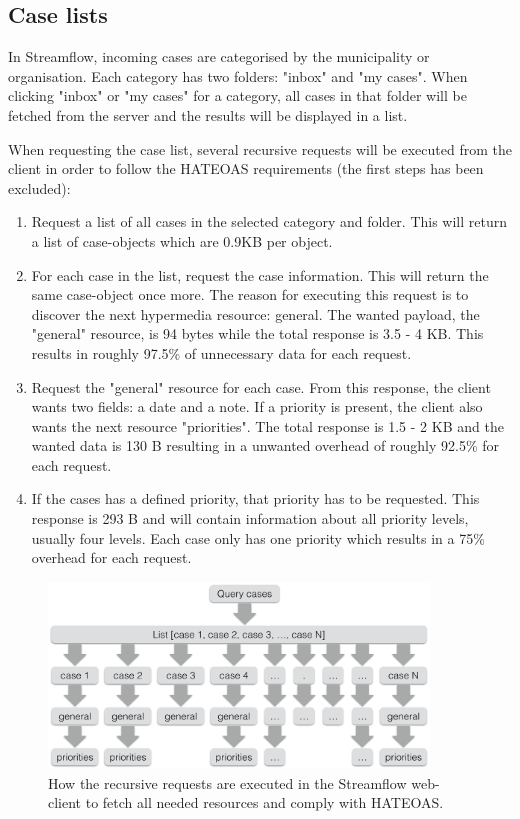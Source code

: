 \documentclass{cslthse-msc}
\begin{document}
\subsection{Case lists}
In Streamflow, incoming cases are categorised by the municipality or organisation. Each category has two folders: "inbox" and "my cases". When clicking "inbox" or "my cases" for a category, all cases in that folder will be fetched from the server and the results will be displayed in a list.

When requesting the case list, several recursive requests will be executed from the client in order to follow the HATEOAS requirements (the first steps has been excluded):

\begin{enumerate}
	\item Request a list of all cases in the selected category and folder. This will return a list of case-objects which are 0.9KB per object.
	\item For each case in the list, request the case information. This will return the same case-object once more. The reason for executing this request is to discover the next hypermedia resource: general. The wanted payload, the "general" resource, is 94 bytes while the total response is 3.5 - 4 KB. This results in roughly 97.5\% of unnecessary data for each request.
	\item Request the "general" resource for each case. From this response, the client wants two fields: a date and a note. If a priority is present, the client also wants the next resource "priorities". The total response is 1.5 - 2 KB and the wanted data is 130 B resulting in a unwanted overhead of roughly 92.5\% for each request.
	\item If the cases has a defined priority, that priority has to be requested. This response is 293 B and will contain information about all priority levels, usually four levels. Each case only has one priority which results in a 75\% overhead for each request.
\end{enumerate}

\begin{figure}[H]
  \centering
    \begin{center}
      \includegraphics[width=0.9\textwidth]{images/streamflow_cases.png}
    \end{center}
  \caption{How the recursive requests are executed in the Streamflow web-client to fetch all needed resources and comply with HATEOAS.}
\end{figure}
\end{document}
